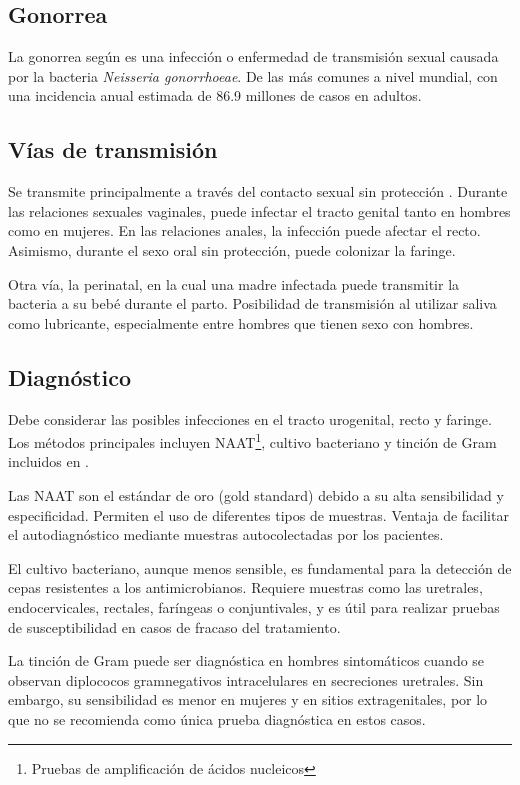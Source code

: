 \begin{enumerate}
\section{Gonorrea}
La gonorrea según \cite{unemo2019gonorrhoea} es una infección o enfermedad de transmisión sexual causada por la bacteria \textit{Neisseria gonorrhoeae}. De las más comunes a nivel mundial, con una incidencia anual estimada de 86.9 millones de casos en adultos.


\subsection{Vías de transmisión}
Se transmite principalmente a través del contacto sexual sin protección \cite{workowski2021sexually}. Durante las relaciones sexuales vaginales, puede infectar el tracto genital tanto en hombres como en mujeres. En las relaciones anales, la infección puede afectar el recto. Asimismo, durante el sexo oral sin protección, puede colonizar la faringe.

Otra vía, la perinatal, en la cual una madre infectada puede transmitir la bacteria a su bebé durante el parto. Posibilidad de transmisión al utilizar saliva como lubricante, especialmente entre hombres que tienen sexo con hombres. 

\subsection{Diagnóstico}
Debe considerar las posibles infecciones en el tracto urogenital, recto y faringe. Los métodos principales incluyen  NAAT\footnote{Pruebas de amplificación de ácidos nucleicos}, cultivo bacteriano y tinción de Gram incluidos en \cite{adamson2022diagnostic}.

Las NAAT son el estándar de oro (gold standard) debido a su alta sensibilidad y especificidad. Permiten el uso de diferentes tipos de muestras. Ventaja de facilitar el autodiagnóstico mediante muestras autocolectadas por los pacientes.

El cultivo bacteriano, aunque menos sensible, es fundamental para la detección de cepas resistentes a los antimicrobianos. Requiere muestras como las uretrales, endocervicales, rectales, faríngeas o conjuntivales, y es útil para realizar pruebas de susceptibilidad en casos de fracaso del tratamiento.

La tinción de Gram puede ser diagnóstica en hombres sintomáticos cuando se observan diplococos gramnegativos intracelulares en secreciones uretrales. Sin embargo, su sensibilidad es menor en mujeres y en sitios extragenitales, por lo que no se recomienda como única prueba diagnóstica en estos casos.


\end{enumerate}
